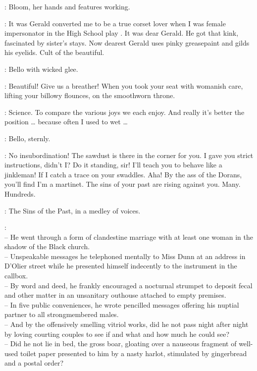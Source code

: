:
Bloom, her hands and features working.

\Bloom:
It was Gerald converted me to be a true corset lover
when I was female impersonator in the High School play .
It was dear Gerald.
He got that kink, fascinated by sister's stays.
Now dearest Gerald uses pinky greasepaint and gilds his eyelids.
Cult of the beautiful.

:
Bello with wicked glee.

\Bello:
Beautiful!
Give us a breather!
When you took your seat with womanish care,
lifting your billowy flounces, on the smoothworn throne.

\Bloom:
Science.
To compare the various joys we each enjoy.
And really it's better the position \ldots
{}
because often I used to wet \ldots

:
Bello, sternly.

\Bello:
No insubordination!
The sawdust is there in the corner for you.
I gave you strict instructions, didn't I?
Do it standing, sir!
I'll teach you to behave like a jinkleman!
If I catch a trace on your swaddles.
Aha!
By the ass of the Dorans, you'll find I'm a martinet.
The sins of your past are rising against you.
Many. Hundreds.


:
The Sins of the Past, in a medley of voices.

\SinsPast:\\
-- He went through a form of clandestine marriage
with at least one woman in the shadow of the Black church.\\
-- Unspeakable messages he telephoned mentally to Miss Dunn
at an address in D'Olier street
while he presented himself indecently to the instrument in the callbox.\\
-- By word and deed, he frankly encouraged a nocturnal strumpet
to deposit fecal and other matter
in an unsanitary outhouse attached to empty premises.\\
-- In five public conveniences, he wrote pencilled messages
offering his nuptial partner to all strongmembered males.\\
-- And by the offensively smelling vitriol works,
did he not pass night after night
by loving courting couples
to see if and what and how much he could see?\\
-- Did he not lie in bed, the gross boar,
gloating over a nauseous fragment of well-used toilet paper
presented to him by a nasty harlot,
stimulated by gingerbread and a postal order?%

